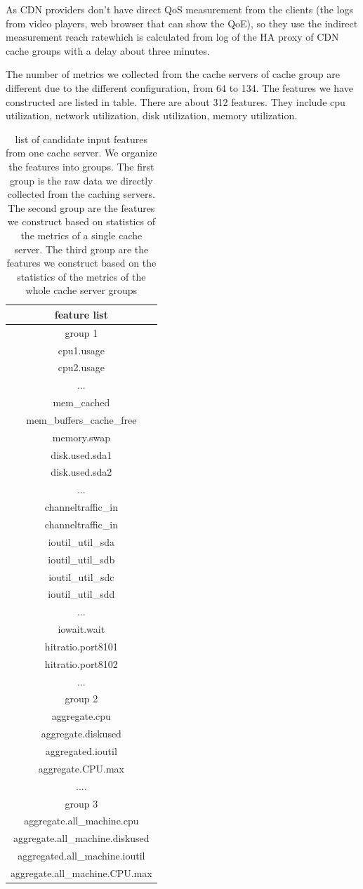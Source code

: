 \documentclass[5p]{elsarticle}
\newcommand{\dabiaolv}{reach rate}
\begin{document}
As CDN providers don't have direct QoS measurement from the clients (the logs from video players, web browser that can show the QoE), so they use the indirect measurement \dabiaolv which is calculated from log of the HA proxy of CDN cache groups with a delay about three minutes. 

The number of metrics we collected from the cache servers of cache group are different due to the different configuration, from 64 to 134. The features we have constructed are listed in table. There are about 312 features. They include cpu utilization, network utilization, disk utilization, memory utilization.

\begin{table}[]
\centering
\begin{tabular}{|c|}
\hline  
feature list\\
\hline  
group 1\\
\hline  
cpu1.usage\\
cpu2.usage\\
...  \\
mem\_cached\\
mem\_buffers\_cache\_free\\
memory.swap\\ 
disk.used.sda1\\
disk.used.sda2\\
...\\
channeltraffic\_in\\
channeltraffic\_in\\
ioutil\_util\_sda\\
ioutil\_util\_sdb\\
ioutil\_util\_sdc\\
ioutil\_util\_sdd\\
...\\
iowait.wait\\
hitratio.port8101\\
hitratio.port8102\\
...\\
\hline  
group 2\\
\hline 
aggregate.cpu\\
aggregate.diskused\\
aggregated.ioutil\\
aggregate.CPU.max\\
....\\
\hline  
group 3\\
\hline 
aggregate.all\_machine.cpu\\
aggregate.all\_machine.diskused\\
aggregated.all\_machine.ioutil\\
aggregate.all\_machine.CPU.max\\
\hline
\end{tabular}
\caption{list of candidate input features from one cache server. We organize the features into groups. The first group is the raw data we directly collected from the caching servers. The second group are the features we construct based on statistics of the metrics of a single cache server. The third group are the features we construct based on the statistics of the metrics of the whole cache server groups}
\label{my-label}
\end{table}
\end{document}
